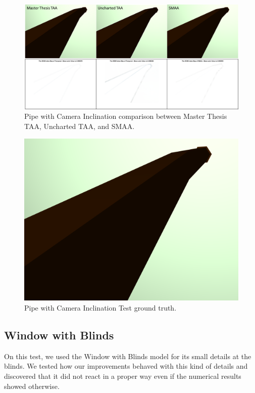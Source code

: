 \documentclass[pregrado]{tesis-usb} %
\begin{document}
\begin{figure}[H]
	\centering
	\includegraphics[scale=0.7]{images/results/pipe_inclination.png}
	\caption{Pipe with Camera Inclination comparison between Master Thesis TAA, Uncharted TAA, and SMAA.}\label{fig:pipe_inclination_render}
\end{figure}

\begin{figure}[H]
	\centering
	\includegraphics[scale=0.2]{images/results/pipe_with_inclination_sobel_ground_truth.png}
	\caption{Pipe with Camera Inclination Test ground truth.}\label{fig:pipe_inclination_truth}
\end{figure}


\subsection{Window with Blinds}
On this test, we used the Window with Blinds model for its small details at the blinds. We tested how our improvements behaved with this kind of details and discovered that it did not react in a proper way even if the numerical results showed otherwise.
\end{document}

